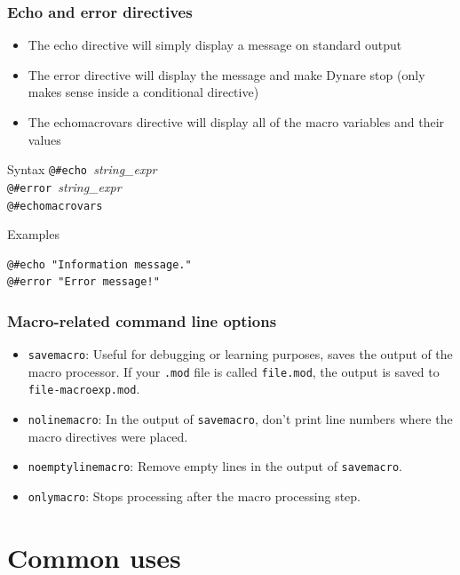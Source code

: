 \documentclass{beamer}
\begin{document}
\begin{frame}[fragile=singleslide]
  \frametitle{Echo and error directives}

  \begin{itemize}
  \item The echo directive will simply display a message on standard output
  \item The error directive will display the message and make Dynare stop (only makes sense inside a conditional directive)
  \item The echomacrovars directive will display all of the macro variables and their values
  \end{itemize}

  \begin{block}{Syntax}
\verb+@#echo +\textit{string\_expr} \\
\verb+@#error +\textit{string\_expr} \\
\verb+@#echomacrovars +
  \end{block}

  \begin{block}{Examples}
\begin{verbatim}
@#echo "Information message."
@#error "Error message!"
\end{verbatim}
  \end{block}
\end{frame}

\begin{frame}
  \frametitle{Macro-related command line options}
  \begin{itemize}
  \item \texttt{savemacro}: Useful for debugging or learning purposes, saves the output of the macro processor. If your \texttt{.mod} file is called \texttt{file.mod}, the output is saved to \texttt{file-macroexp.mod}.
  \item \texttt{nolinemacro}: In the output of \texttt{savemacro}, don't print line numbers where the macro directives were placed.
  \item \texttt{noemptylinemacro}: Remove empty lines in the output of \texttt{savemacro}.
  \item \texttt{onlymacro}: Stops processing after the macro processing step.
  \end{itemize}
\end{frame}

\section{Common uses}
\end{document}
